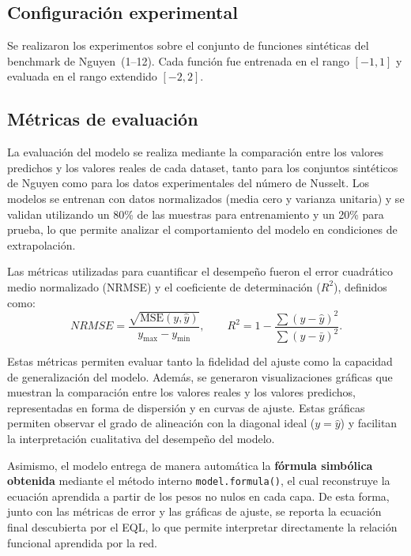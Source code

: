 \subsection{Configuración experimental}

Se realizaron los experimentos sobre el conjunto de funciones sintéticas del benchmark de Nguyen~(1--12). Cada función fue entrenada en el rango $[-1,1]$ y evaluada en el rango extendido $[-2,2]$. 



\subsection{Métricas de evaluación}

La evaluación del modelo se realiza mediante la comparación entre los valores predichos y los valores reales de cada dataset, tanto para los conjuntos sintéticos de Nguyen como para los datos experimentales del número de Nusselt. Los modelos se entrenan con datos normalizados (media cero y varianza unitaria) y se validan utilizando un 80\% de las muestras para entrenamiento y un 20\% para prueba, lo que permite analizar el comportamiento del modelo en condiciones de extrapolación.

Las métricas utilizadas para cuantificar el desempeño fueron el error cuadrático medio normalizado (NRMSE) y el coeficiente de determinación ($R^2$), definidos como:
\begin{equation}
NRMSE = \frac{\sqrt{\text{MSE}(y,\hat{y})}}{y_{\max}-y_{\min}}, 
\qquad
R^2 = 1 - \frac{\sum(y-\hat{y})^2}{\sum(y-\bar{y})^2}.
\end{equation}

Estas métricas permiten evaluar tanto la fidelidad del ajuste como la capacidad de generalización del modelo. 
Además, se generaron visualizaciones gráficas que muestran la comparación entre los valores reales y los valores predichos, representadas en forma de dispersión y en curvas de ajuste. Estas gráficas permiten observar el grado de alineación con la diagonal ideal ($y = \hat{y}$) y facilitan la interpretación cualitativa del desempeño del modelo.

Asimismo, el modelo entrega de manera automática la \textbf{fórmula simbólica obtenida} mediante el método interno \texttt{model.formula()}, el cual reconstruye la ecuación aprendida a partir de los pesos no nulos en cada capa. De esta forma, junto con las métricas de error y las gráficas de ajuste, se reporta la ecuación final descubierta por el EQL, lo que permite interpretar directamente la relación funcional aprendida por la red. 

